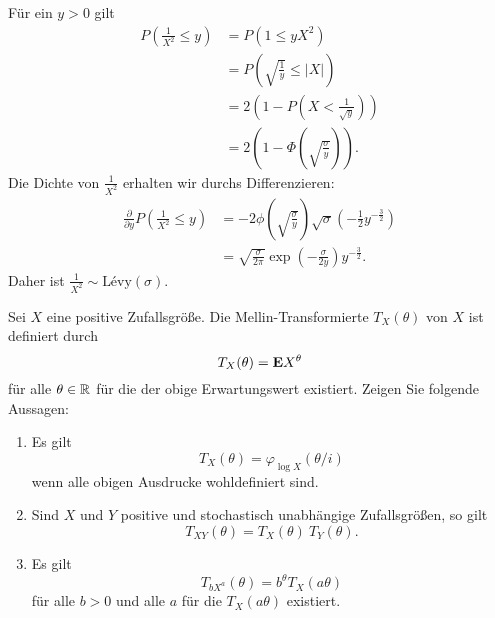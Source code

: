 \solution 
Für ein $y>0$ gilt
\begin{align*}
    P \left( \frac{1}{X^{2}} \leq y \right) &= P \left( 1 \leq y X^{2}   \right) \\
    &= P \left( \sqrt{\frac{1}{y}} \leq | X | \right) \\
    &= 2 \left( 1 - P \left( X < \frac{1}{\sqrt{y}} \right) \right) \\
    &= 2 \left( 1 - \Phi\left( \sqrt{ \frac{\sigma}{y}} \right) \right).
\end{align*}
Die Dichte von $\frac{1}{X^2}$ erhalten wir durchs Differenzieren:
\begin{align*}
    \frac{\partial}{\partial y} P \left( \frac{1}{X^2} \leq y \right) &=
    -2 \phi \left( \sqrt{\frac{\sigma}{y}} \right) \sqrt{\sigma} 
    \left( -\frac{1}{2} y^{-\frac{3}{2}} \right) \\
    &= \sqrt{\frac{\sigma}{2 \pi}} \exp \left( - \frac{\sigma}{2 y} \right) y^{-\frac{3}{2}}.
\end{align*}
Daher ist $\frac{1}{X^2} \sim \text{L\'evy}(\sigma)$.


 Sei $X$ eine positive Zufallsgröße.
Die Mellin-Transformierte $T_{X}(\theta)$ von $X$ ist definiert durch
\begin{equation*}
    T_{X}(\theta) = \mathbf E X^{\theta}
\end{equation*}
für alle $\theta\in\mathbb R$ für die der obige Erwartungswert existiert. Zeigen Sie
folgende Aussagen:
\begin{enumerate}
    \item Es gilt
        \begin{equation*}
            T_{X}(\theta) = \varphi_{ \log X} (\theta/i)
        \end{equation*}
        wenn alle obigen Ausdrucke wohldefiniert sind.
    \item Sind $X$ und $Y$ positive und stochastisch unabhängige Zufallsgrößen, so gilt
        \begin{equation*}
            T_{XY}(\theta) = T_{X}(\theta) \ T_{Y}(\theta). 
        \end{equation*}
    \item Es gilt
        \begin{equation*}
            T_{b X^{a}}(\theta) = b^{\theta} T_{X} (a\theta)
        \end{equation*}
        für alle $b>0$ und alle $a$ für die $T_{X}(a\theta)$ existiert. 
\end{enumerate}


